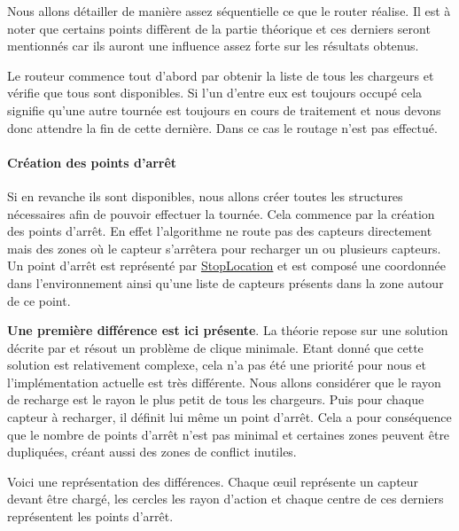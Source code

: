 \documentclass[final]{polytech/polytech}
\newcommand{\klass}[1]{\hyperref[class:#1]{#1}}
\begin{document}
				Nous allons détailler de manière assez séquentielle ce que le router réalise.
				Il est à noter que certains points diffèrent de la partie théorique et ces derniers seront mentionnés car ils auront une influence assez forte sur les résultats obtenus.
				
				Le routeur commence tout d'abord par obtenir la liste de tous les chargeurs et vérifie que tous sont disponibles.
				Si l'un d'entre eux est toujours occupé cela signifie qu'une autre tournée est toujours en cours de traitement et nous devons donc attendre la fin de cette dernière.
				Dans ce cas le routage n'est pas effectué.
				
				\paragraph{Création des points d'arrêt}
					Si en revanche ils sont disponibles, nous allons créer toutes les structures nécessaires afin de pouvoir effectuer la tournée.
					Cela commence par la création des points d'arrêt.
					En effet l'algorithme ne route pas des capteurs directement mais des zones où le capteur s'arrêtera pour recharger un ou plusieurs capteurs.
					Un point d'arrêt est représenté par \klass{StopLocation} et est composé une coordonnée dans l'environnement ainsi qu'une liste de capteurs présents dans la zone autour de ce point.
					
					\textbf{Une première différence est ici présente}. La théorie repose sur une solution décrite par \cite{KHELLADI201744} et résout un problème de clique minimale.
					Etant donné que cette solution est relativement complexe, cela n'a pas été une priorité pour nous et l'implémentation actuelle est très différente.
					Nous allons considérer que le rayon de recharge est le rayon le plus petit de tous les chargeurs.
					Puis pour chaque capteur à recharger, il définit lui même un point d'arrêt.
					Cela a pour conséquence que le nombre de points d'arrêt n'est pas minimal et certaines zones peuvent être dupliquées, créant aussi des zones de conflict inutiles.
					
					Voici une représentation des différences.
					Chaque \oe uil représente un capteur devant être chargé, les cercles les rayon d'action et chaque centre de ces derniers représentent les points d'arrêt.
					
\end{document}
